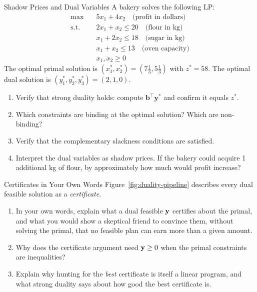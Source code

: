 \begin{ex}{Shadow Prices and Dual Variables}{}
 A bakery solves the following LP:
\[
\begin{aligned}
\max \quad & 5x_1 + 4x_2 \quad \text{(profit in dollars)}\\
\text{s.t.} \quad
& 2x_1 + x_2 \leq 20 \quad \text{(flour in kg)} \\
& x_1 + 2x_2 \leq 18 \quad \text{(sugar in kg)} \\
& x_1 + x_2 \leq 13 \quad \text{(oven capacity)} \\
& x_1, x_2 \geq 0
\end{aligned}
\]
The optimal primal solution is $(x_1^*, x_2^*) = (7\tfrac{1}{3}, 5\tfrac{1}{3})$ with $z^* = 58$.
The optimal dual solution is $(y_1^*, y_2^*, y_3^*) = (2, 1, 0)$.

\begin{enumerate}
\item Verify that strong duality holds: compute $\mathbf{b}^\top \mathbf{y}^*$ and confirm it equals $z^*$.
\item Which constraints are binding at the optimal solution? Which are non-binding?
\item Verify that the complementary slackness conditions are satisfied.
\item Interpret the dual variables as shadow prices. If the bakery could acquire 1 additional kg of flour, by approximately how much would profit increase?
\end{enumerate}
\end{ex}


\begin{ex}{Certificates in Your Own Words}{}
 Figure~\ref{fig:duality-pipeline} describes every dual feasible solution as a \emph{certificate}.
\begin{enumerate}
\item In your own words, explain what a dual feasible $\mathbf{y}$ certifies about the primal, and what you would show a skeptical friend to convince them, without solving the primal, that no feasible plan can earn more than a given amount.
\item Why does the certificate argument need $\mathbf{y} \geq 0$ when the primal constraints are inequalities?
\item Explain why hunting for the \emph{best} certificate is itself a linear program, and what strong duality says about how good the best certificate is.
\end{enumerate}
\end{ex}

